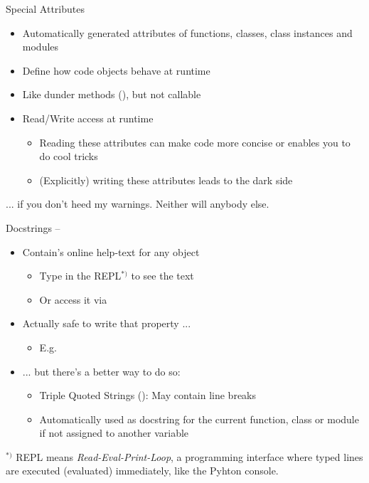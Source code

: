 
\begin{frame}[fragile]{Special Attributes}
%
\begin{itemize}
\item Automatically generated attributes of functions, classes, class instances and modules
\item Define how code objects behave at runtime
\item Like dunder methods (\zB {}), but not callable
\item Read/Write access at runtime
	\begin{itemize}
	\item Reading these attributes can make code more concise or enables you to do cool tricks
	\item (Explicitly) writing these attributes leads to the dark side
	\end{itemize}
\end{itemize}
%
\vspace{6pt}
\begin{warnbox}
... if you don't heed my warnings. Neither will anybody else.
\end{warnbox}
%
\end{frame}


\begin{frame}[fragile]{Docstrings -- }
%
\begin{itemize}
\item Contain's online help-text for any object
	\begin{itemize}
	\item Type  in the REPL$^{*)}$ to see the text
	\item Or access it via  
	\end{itemize}
\item Actually safe to write that property ...
	\begin{itemize}
	\item E.\;g. 
	\end{itemize}
\item ... but there's a better way to do so:
	\begin{itemize}
	\item Triple Quoted Strings (): May contain line breaks
	\item Automatically used as docstring for the current function, class or module if not assigned to another variable
	\end{itemize}
\end{itemize}
%
\begin{hintbox}[REPL]
$^{*)}$ REPL means \emph{Read-Eval-Print-Loop}, \ie a programming interface where typed lines are executed (evaluated) immediately, like the Pyhton console.
\end{hintbox}
%
\end{frame}

